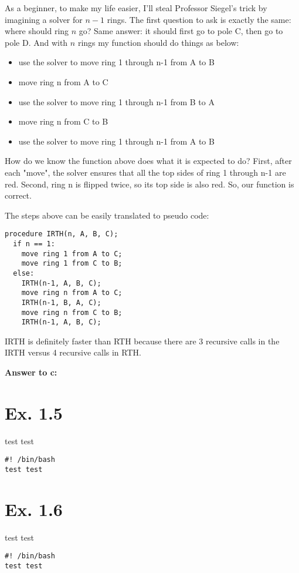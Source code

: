 \documentclass[a4paper,11pt]{article}
\theoremstyle{mytheor}
\begin{document}
As a beginner, to make my life easier, I'll steal Professor Siegel's trick by imagining a solver for $n-1$ rings. The first question to ask is exactly the same: where should ring $n$ go? Same answer: it should first go to pole C, then go to pole D. And with $n$ rings my function should do things as below:
\begin{itemize}
    \item use the solver to move ring 1 through n-1 from A to B
    \item move ring n from A to C
    \item use the solver to move ring 1 through n-1 from B to A
    \item move ring n from C to B
    \item use the solver to move ring 1 through n-1 from A to B
\end{itemize}
How do we know the function above does what it is expected to do?
First, after each "move", the solver ensures that all the top sides of ring 1 through n-1 are red. Second, ring n is flipped twice, so its top side is also red. So, our function is correct.

The steps above can be easily translated to pseudo code:
\begin{lstlisting}[label={list:seventh1},caption=Improved Red Tower of Hanoi procedure.]
procedure IRTH(n, A, B, C);
  if n == 1:
    move ring 1 from A to C;
    move ring 1 from C to B;
  else:
    IRTH(n-1, A, B, C);
    move ring n from A to C;
    IRTH(n-1, B, A, C);
    move ring n from C to B;
    IRTH(n-1, A, B, C);
\end{lstlisting}
IRTH is definitely faster than RTH because there are 3 recursive calls in the IRTH versus 4 recursive calls in RTH.

\textbf{Answer to c:} 


\section*{Ex. 1.5}
test test
\begin{lstlisting}[label={list:eighth},caption=Sample Bash code.]
#! /bin/bash
test test
\end{lstlisting}

\section*{Ex. 1.6}
test test
\begin{lstlisting}[label={list:nineth},caption=Sample Bash code.]
#! /bin/bash
test test
\end{lstlisting}
\end{document}

